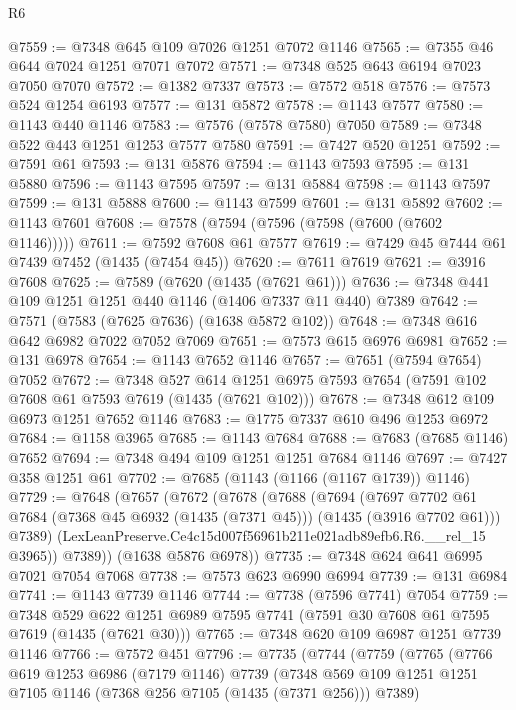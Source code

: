 \begin{lexlean}{R6}
\begin{coremodule}
@7559 := @7348 @645 @109 @7026 @1251 @7072 @1146
@7565 := @7355 @46 @644 @7024 @1251 @7071 @7072
@7571 := @7348 @525 @643 @6194 @7023 @7050 @7070
@7572 := @1382 @7337
@7573 := @7572 @518
@7576 := @7573 @524 @1254 @6193
@7577 := @131 @5872
@7578 := @1143 @7577
@7580 := @1143 @440 @1146
@7583 := @7576 (@7578 @7580) @7050
@7589 := @7348 @522 @443 @1251 @1253 @7577 @7580
@7591 := @7427 @520 @1251
@7592 := @7591 @61
@7593 := @131 @5876
@7594 := @1143 @7593
@7595 := @131 @5880
@7596 := @1143 @7595
@7597 := @131 @5884
@7598 := @1143 @7597
@7599 := @131 @5888
@7600 := @1143 @7599
@7601 := @131 @5892
@7602 := @1143 @7601
@7608 := @7578 (@7594 (@7596 (@7598 (@7600 (@7602 @1146)))))
@7611 := @7592 @7608 @61 @7577
@7619 := @7429 @45 @7444 @61 @7439 @7452 (@1435 (@7454 @45))
@7620 := @7611 @7619
@7621 := @3916 @7608
@7625 := @7589 (@7620 (@1435 (@7621 @61)))
@7636 := @7348 @441 @109 @1251 @1251 @440 @1146 (@1406 @7337 @11 @440) @7389
@7642 := @7571 (@7583 (@7625 @7636) (@1638 @5872 @102))
@7648 := @7348 @616 @642 @6982 @7022 @7052 @7069
@7651 := @7573 @615 @6976 @6981
@7652 := @131 @6978
@7654 := @1143 @7652 @1146
@7657 := @7651 (@7594 @7654) @7052
@7672 := @7348
    @527
    @614
    @1251
    @6975
    @7593
    @7654
    (@7591 @102 @7608 @61 @7593 @7619 (@1435 (@7621 @102)))
@7678 := @7348 @612 @109 @6973 @1251 @7652 @1146
@7683 := @1775 @7337 @610 @496 @1253 @6972
@7684 := @1158 @3965
@7685 := @1143 @7684
@7688 := @7683 (@7685 @1146) @7652
@7694 := @7348 @494 @109 @1251 @1251 @7684 @1146
@7697 := @7427 @358 @1251 @61
@7702 := @7685 (@1143 (@1166 (@1167 @1739)) @1146)
@7729 := @7648
    (@7657
      (@7672
        (@7678
          (@7688
            (@7694
              (@7697
                @7702
                @61
                @7684
                (@7368 @45 @6932 (@1435 (@7371 @45)))
                (@1435 (@3916 @7702 @61)))
              @7389)
            (LexLeanPreserve.Ce4c15d007f56961b211e021adb89efb6.R6.__rel_15 @3965))
          @7389))
      (@1638 @5876 @6978))
@7735 := @7348 @624 @641 @6995 @7021 @7054 @7068
@7738 := @7573 @623 @6990 @6994
@7739 := @131 @6984
@7741 := @1143 @7739 @1146
@7744 := @7738 (@7596 @7741) @7054
@7759 := @7348
    @529
    @622
    @1251
    @6989
    @7595
    @7741
    (@7591 @30 @7608 @61 @7595 @7619 (@1435 (@7621 @30)))
@7765 := @7348 @620 @109 @6987 @1251 @7739 @1146
@7766 := @7572 @451
@7796 := @7735
    (@7744
      (@7759
        (@7765
          (@7766
            @619
            @1253
            @6986
            (@7179 @1146)
            @7739
            (@7348 @569 @109 @1251 @1251 @7105 @1146 (@7368 @256 @7105 (@1435 (@7371 @256))) @7389)

\end{coremodule}
\end{lexlean}
